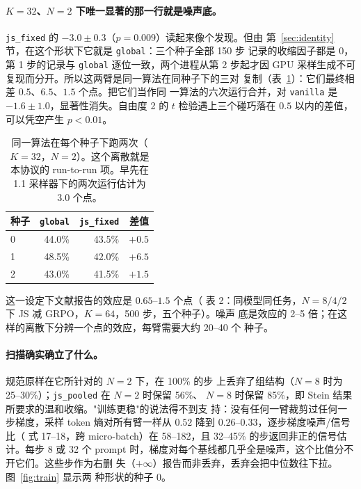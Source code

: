 \documentclass{article}
\newcommand{\arm}[1]{\texttt{#1}}
\begin{document}
\paragraph{$K=32$、$N=2$ 下唯一显著的那一行就是噪声底。}
\label{sec:floor}
\arm{js\_fixed} 的 $-3.0\pm0.3$（$p=0.009$）读起来像个发现。但由
第~\ref{sec:identity} 节，在这个形状下它就是 \arm{global}：三个种子全部 150 步
记录的收缩因子都是 $0$，第 1 步的记录与 \arm{global} 逐位一致，两个进程从第 2
步起才因 GPU 采样生成不可复现而分开。所以这两臂是同一算法在同种子下的三对
复制（表~\ref{tab:twins}）：它们最终相差 $0.5$、$6.5$、$1.5$ 个点。把它们当作同
一算法的六次运行合并，对 \arm{vanilla} 是 $-1.6\pm1.0$，显著性消失。自由度 2
的 $t$ 检验遇上三个碰巧落在 $0.5$ 以内的差值，可以凭空产生 $p<0.01$。

\begin{table}[t]\centering\small
\begin{tabular}{lrrr}
\toprule
种子 & \arm{global} & \arm{js\_fixed} & 差值 \\
\midrule
0 & 44.0\% & 43.5\% & $+0.5$ \\
1 & 48.5\% & 42.0\% & $+6.5$ \\
2 & 43.0\% & 41.5\% & $+1.5$ \\
\bottomrule
\end{tabular}
\caption{同一算法在每个种子下跑两次（$K=32$，$N=2$）。这个离散就是本协议的
run-to-run 项。早先在 1.1 采样器下的两次运行估计为 $3.0$ 个点。}
\label{tab:twins}
\end{table}

这一设定下文献报告的效应是 $0.65$--$1.5$ 个点（\citet{zeng2025shrinking}
表 2：同模型同任务，$N=8/4/2$ 下 JS 减 GRPO，$K=64$，500 步，五个种子）。噪声
底是效应的 2--5 倍；在这样的离散下分辨一个点的效应，每臂需要大约 20--40 个
种子。

\paragraph{扫描确实确立了什么。} 规范原样在它所针对的 $N=2$ 下，在 100\% 的步
上丢弃了组结构（$N=8$ 时为 25--30\%）；\arm{js\_pooled} 在 $N=2$ 时保留 56\%、
$N=8$ 时保留 85\%，即 Stein 结果所要求的温和收缩。"训练更稳"的说法得不到支
持：没有任何一臂裁剪过任何一步梯度，采样 token 熵对所有臂一样从 $0.52$ 降到
$0.26$--$0.33$，逐步梯度噪声/信号比（\citet{zeng2025shrinking} 式 17--18，跨
micro-batch）在 58--182，且 32--45\% 的步返回非正的信号估计。每步 8 或 32 个
prompt 时，梯度对每个基线都几乎全是噪声，这个比值分不开它们。这些步作为右删
失（$+\infty$）报告而非丢弃，丢弃会把中位数往下拉。图~\ref{fig:train} 显示两
种形状的种子 0。
\end{document}
